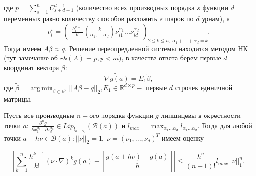 \documentclass[12 pt, russian]{article}
\DeclareMathOperator*{\argmin}{arg\,min}
\begin{document}
где $p = \sum_{s=1}^{n} C_{s+d-1}^{d-1}$ (количество всех производных порядка $s$ функции $d$ переменных равно количеству способов разложить $s$ шаров по $d$ урнам), а $$\nu_i^{\star} = \begin{pmatrix} \frac{h^{k-1}_i}{k!}\binom{k}{\alpha_1, \dots, \alpha_d} \nu_{i1}^{\alpha_1}...\nu_{id}^{\alpha_d}\end{pmatrix}_{2\leq k \leq n, \; \alpha_1 + ... + \alpha_d = k}.$$ Тогда имеем $A\beta \approx q$. Решение переопредленной системы находится методом НК (тут замечание об $rk(A) = p, p < m)$, в качестве ответа берем первые $d$ координат вектора $\beta:$
\[ \tilde{\nabla g(a)} = E_1 \tilde{ \beta},\]
где $\tilde{ \beta} = \argmin_{\beta \in \mathbb{R}^p} ||A\beta - q||_2, E_1 \in \mathbb{R}^{d \times p} - $ первые $d$ строчек единичной матрицы.
\begin{Lemm}
Пусть все производные $n-$ого порядка функции $g$ липщицевы в окрестности точки $a$: $\frac{\partial^n g}{\partial x_1^{\alpha_1}...\partial x_d^{\alpha_d}} \in Lip_{l_{\alpha_1...\alpha_d}}(\mathcal{B}(a))$ и $l_{max} = \max_{\alpha_1...\alpha_d} l_{\alpha_1...\alpha_d}.$ Тогда для любой точки $a + h\nu \in \mathcal{B}(a): ||\nu||_2 =1, \; \nu = (\nu_1, ..., \nu_d)^T $ имеем оценку

$$ \left| \sum_{k=1}^n \frac{h^{k-1}}{k!}(\nu \cdot \nabla)^k g(a) - \left[ \frac{g(a + h\nu) - g(a)}{h} \right] \right| \leq \frac{h^n}{(n+1)!}l_{max}||\nu||^n_1.$$

\end{Lemm}
\end{document}
